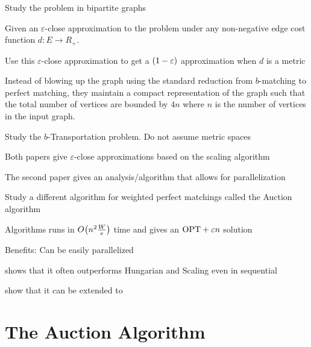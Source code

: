 \begin{desclist}
    \item Study the \minpbmatch{} problem in bipartite graphs 
    \item Given an $\varepsilon$-close approximation to the problem under any non-negative edge cost function $d \colon E \to R_+$. 
    \item Use this $\varepsilon$-close approximation to get a $\left( 1-\varepsilon \right)$ approximation when $d$ is a metric
    \item Instead of blowing up the graph using the standard reduction from $b$-matching to perfect matching, they maintain a compact representation of the graph such that the total number of vertices are bounded by $4n$
          where $n$ is the number of vertices in the input graph. 
\end{desclist}

\begin{desclist}
    \item Study the $b$-\textsf{Transportation} problem. Do not assume metric spaces
    \item Both papers give $\varepsilon$-close approximations based on the scaling algorithm
    \item The second paper gives an analysis/algorithm that allows for parallelization
\end{desclist}

\begin{desclist}
    \item Study a different algorithm for weighted perfect matchings called the \textsf{Auction} algorithm 
    \item Algorithms runs in $O_{} \! \left( n^2\frac{W}{e} \right)$ time and gives an $\mathrm{OPT} + \varepsilon n$ solution
    \item Benefits: Can be easily parallelized
    \item \cite{alfaro2022assignment} shows that it often outperforms Hungarian and Scaling even in sequential
    \item \cite{bertsekas1989auction} show that it can be extended to \minpbmatch{} 
\end{desclist}

\section{The Auction Algorithm}

